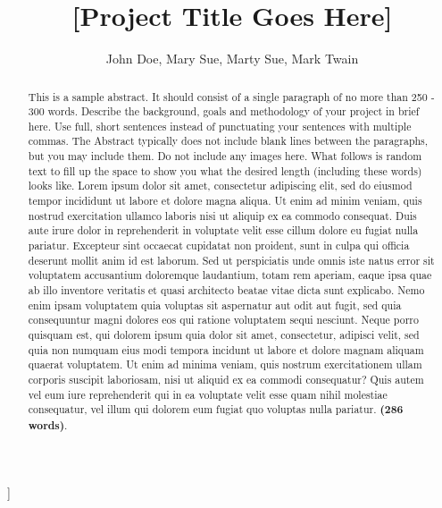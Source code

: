 \documentclass[ 12pt,a4paper,twocolumn,fleqn]{article}
\begin{document}
\begin{@twocolumnfalse}
\title {[Project Title Goes Here]}
\author{John Doe, Mary Sue, Marty Sue, Mark Twain}
\maketitle
\begin{abstract}
This is a sample abstract. It should consist of a single paragraph of no more than 250 - 300 words. Describe the background, goals and methodology of your project in brief here. Use full, short sentences instead of punctuating your sentences with multiple commas. The Abstract typically does not include blank lines between the paragraphs, but you may include them. Do not include any images here. What follows is random text to fill up the space to show you what the desired length (including these words) looks like.  Lorem ipsum dolor sit amet, consectetur adipiscing elit, sed do eiusmod tempor incididunt ut labore et dolore magna aliqua. Ut enim ad minim veniam, quis nostrud exercitation ullamco laboris nisi ut aliquip ex ea commodo consequat. Duis aute irure dolor in reprehenderit in voluptate velit esse cillum dolore eu fugiat nulla pariatur. Excepteur sint occaecat cupidatat non proident, sunt in culpa qui officia deserunt mollit anim id est laborum. Sed ut perspiciatis unde omnis iste natus error sit voluptatem accusantium doloremque laudantium, totam rem aperiam, eaque ipsa quae ab illo inventore veritatis et quasi architecto beatae vitae dicta sunt explicabo. Nemo enim ipsam voluptatem quia voluptas sit aspernatur aut odit aut fugit, sed quia consequuntur magni dolores eos qui ratione voluptatem sequi nesciunt. Neque porro quisquam est, qui dolorem ipsum quia dolor sit amet, consectetur, adipisci velit, sed quia non numquam eius modi tempora incidunt ut labore et dolore magnam aliquam quaerat voluptatem. Ut enim ad minima veniam, quis nostrum exercitationem ullam corporis suscipit laboriosam, nisi ut aliquid ex ea commodi consequatur? Quis autem vel eum iure reprehenderit qui in ea voluptate velit esse quam nihil molestiae consequatur, vel illum qui dolorem eum fugiat quo voluptas nulla pariatur. \textbf{(286 words)}.
\end{abstract}
\end{@twocolumnfalse}]
\linenumbers
\modulolinenumbers[5]
\end{document}
